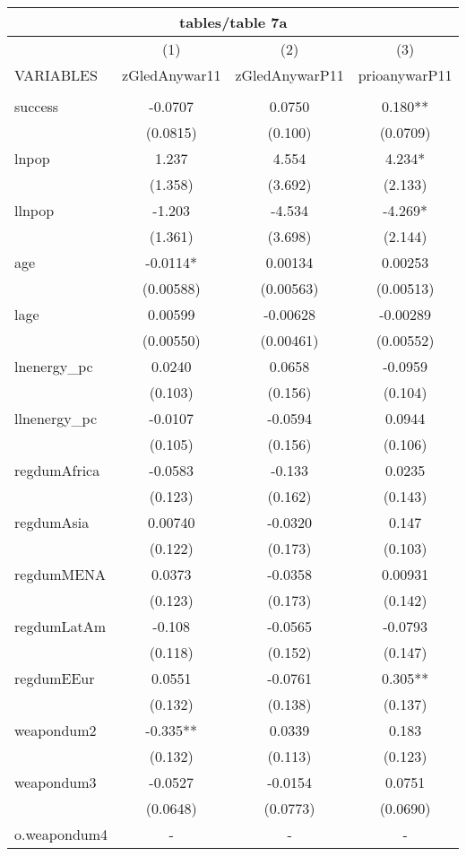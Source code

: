 \documentclass[]{article}
\begin{document}
\begin{tabular}{lccc}
\multicolumn{4}{c}{tables/table 7a} \\ \hline
 & (1) & (2) & (3) \\
VARIABLES & zGledAnywar11 & zGledAnywarP11 & prioanywarP11 \\ \hline
 &  &  &  \\
success & -0.0707 & 0.0750 & 0.180** \\
 & (0.0815) & (0.100) & (0.0709) \\
lnpop & 1.237 & 4.554 & 4.234* \\
 & (1.358) & (3.692) & (2.133) \\
llnpop & -1.203 & -4.534 & -4.269* \\
 & (1.361) & (3.698) & (2.144) \\
age & -0.0114* & 0.00134 & 0.00253 \\
 & (0.00588) & (0.00563) & (0.00513) \\
lage & 0.00599 & -0.00628 & -0.00289 \\
 & (0.00550) & (0.00461) & (0.00552) \\
lnenergy\_pc & 0.0240 & 0.0658 & -0.0959 \\
 & (0.103) & (0.156) & (0.104) \\
llnenergy\_pc & -0.0107 & -0.0594 & 0.0944 \\
 & (0.105) & (0.156) & (0.106) \\
regdumAfrica & -0.0583 & -0.133 & 0.0235 \\
 & (0.123) & (0.162) & (0.143) \\
regdumAsia & 0.00740 & -0.0320 & 0.147 \\
 & (0.122) & (0.173) & (0.103) \\
regdumMENA & 0.0373 & -0.0358 & 0.00931 \\
 & (0.123) & (0.173) & (0.142) \\
regdumLatAm & -0.108 & -0.0565 & -0.0793 \\
 & (0.118) & (0.152) & (0.147) \\
regdumEEur & 0.0551 & -0.0761 & 0.305** \\
 & (0.132) & (0.138) & (0.137) \\
weapondum2 & -0.335** & 0.0339 & 0.183 \\
 & (0.132) & (0.113) & (0.123) \\
weapondum3 & -0.0527 & -0.0154 & 0.0751 \\
 & (0.0648) & (0.0773) & (0.0690) \\
o.weapondum4 & - & - & - \\

\end{tabular}
\end{document}
